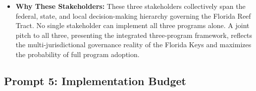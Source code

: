 \documentclass[10pt,letterpaper]{article}
\begin{document}
\begin{itemize}
\begin{enumerate}
    \end{enumerate}

    \item \textbf{Why These Stakeholders:} These three stakeholders collectively span the federal, state, and local decision-making hierarchy governing the Florida Reef Tract. No single stakeholder can implement all three programs alone. A joint pitch to all three, presenting the integrated three-program framework, reflects the multi-jurisdictional governance reality of the Florida Keys and maximizes the probability of full program adoption.

\end{itemize}

\subsection*{Prompt 5: Implementation Budget}
\end{document}
